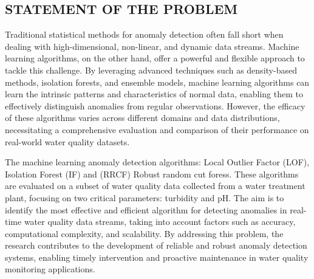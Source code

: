 \documentclass[12pt]{report}
\begin{document}
\subsection{STATEMENT OF THE PROBLEM}
\par
Traditional statistical methods for anomaly detection often fall short when dealing with high-dimensional, non-linear, and dynamic data streams. Machine learning algorithms, on the other hand, offer a powerful and flexible approach to tackle this challenge. By leveraging advanced techniques such as density-based methods, isolation forests, and ensemble models, machine learning algorithms can learn the intrinsic patterns and characteristics of normal data, enabling them to effectively distinguish anomalies from regular observations. However, the efficacy of these algorithms varies across different domains and data distributions, necessitating a comprehensive evaluation and comparison of their performance on real-world water quality datasets.
\par
The  machine learning anomaly detection algorithms: Local Outlier Factor (LOF), Isolation Forest (IF) and  (RRCF) Robust
random cut foress. These algorithms are evaluated on a subset of water quality data collected from a water treatment plant, focusing on two critical parameters: turbidity and pH. The aim is   to identify the most effective and efficient algorithm for detecting anomalies in real-time water quality data streams, taking into account factors such as accuracy, computational complexity, and scalability. By addressing this problem, the research contributes to the development of reliable and robust anomaly detection systems, enabling timely intervention and proactive maintenance in water quality monitoring applications.
\end{document}
